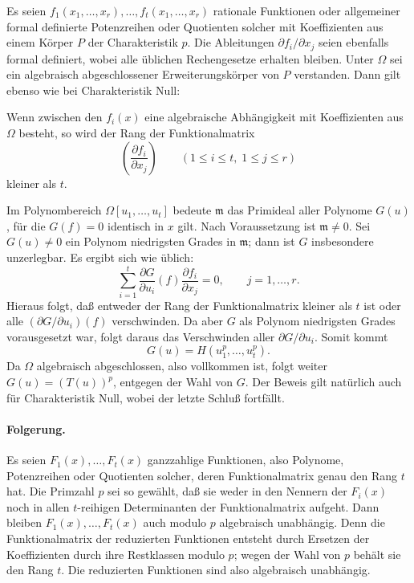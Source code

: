 \documentclass[11pt]{article}
\begin{document}
Es seien \(f_1(x_1,\ldots,x_r),\ldots,f_t(x_1,\ldots,x_r)\) rationale Funktionen oder allgemeiner formal definierte Potenzreihen oder Quotienten solcher mit Koeffizienten aus einem Körper \(P\) der Charakteristik \(p\). Die Ableitungen \(\partial f_i/\partial x_j\) seien ebenfalls formal definiert, wobei alle üblichen Rechengesetze erhalten bleiben. Unter \(\Omega\) sei ein algebraisch abgeschlossener Erweiterungskörper von \(P\) verstanden. Dann gilt ebenso wie bei Charakteristik Null:

Wenn zwischen den \(f_i(x)\) eine algebraische Abhängigkeit mit Koeffizienten aus \(\Omega\) besteht, so wird der Rang der Funktionalmatrix
\[
        \left(\frac{\partial f_i}{\partial x_j}\right)
        \qquad (1\le i\le t,\;1\le j\le r)
\]
kleiner als \(t\).

Im Polynombereich \(\Omega[u_1,\ldots,u_t]\) bedeute \(\mathfrak m\) das Primideal aller Polynome \(G(u)\), für die \(G(f)=0\) identisch in \(x\) gilt. Nach Voraussetzung ist \(\mathfrak m\ne0\). Sei \(G(u)\ne0\) ein Polynom niedrigsten Grades in \(\mathfrak m\); dann ist \(G\) insbesondere unzerlegbar. Es ergibt sich wie üblich:
\[
 \sum_{i=1}^t \frac{\partial G}{\partial u_i}(f)\frac{\partial f_i}{\partial x_j}=0,
        \qquad j=1,\ldots,r .
\]
Hieraus folgt, daß entweder der Rang der Funktionalmatrix kleiner als \(t\) ist oder alle \((\partial G/\partial u_i)(f)\) verschwinden. Da aber \(G\) als Polynom niedrigsten Grades vorausgesetzt war, folgt daraus das Verschwinden aller \(\partial G/\partial u_i\). Somit kommt
\[
        G(u)=H(u_1^p,\ldots,u_t^p).
\]
Da \(\Omega\) algebraisch abgeschlossen, also vollkommen ist, folgt weiter \(G(u)=(T(u))^p\), entgegen der Wahl von \(G\). Der Beweis gilt natürlich auch für Charakteristik Null, wobei der letzte Schluß fortfällt.

\paragraph{Folgerung.}
Es seien \(F_1(x),\ldots,F_t(x)\) ganzzahlige Funktionen, also Polynome, Potenzreihen oder Quotienten solcher, deren Funktionalmatrix genau den Rang \(t\) hat. Die Primzahl \(p\) sei so gewählt, daß sie weder in den Nennern der \(F_i(x)\) noch in allen \(t\)-reihigen Determinanten der Funktionalmatrix aufgeht. Dann bleiben \(F_1(x),\ldots,F_t(x)\) auch modulo \(p\) algebraisch unabhängig. Denn die Funktionalmatrix der reduzierten Funktionen entsteht durch Ersetzen der Koeffizienten durch ihre Restklassen modulo \(p\); wegen der Wahl von \(p\) behält sie den Rang \(t\). Die reduzierten Funktionen sind also algebraisch unabhängig.
\end{document}
